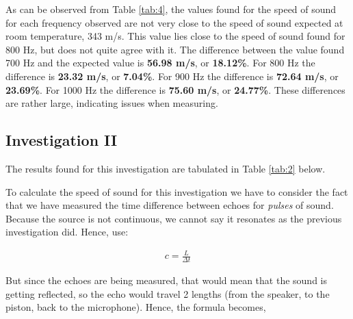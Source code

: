 \documentclass[12pt]{article}
\begin{document}
As can be observed from Table \ref{tab:4}, the values found for the speed of sound for each frequency observed are not very close to the speed of sound expected at room temperature, 343 m/s.
This value lies close to the speed of sound found for 800 Hz, but does not quite agree with it. The difference between the value found 700 Hz and the expected value is \textbf{56.98 m/s}, or \textbf{18.12\%}. For 800 Hz the difference is \textbf{23.32 m/s}, or \textbf{7.04\%}.
For 900 Hz the difference is \textbf{72.64 m/s}, or \textbf{23.69\%}. For 1000 Hz the difference is \textbf{75.60 m/s}, or \textbf{24.77\%}. These differences are rather large, indicating issues when measuring.

\subsection{Investigation II}

The results found for this investigation are tabulated in Table \ref{tab:2} below.

\begin{table}[H]
    \centering
    \caption{Table of the results found for square wave sound pulses.}
    \label{tab:2}
\end{table}

To calculate the speed of sound for this investigation we have to consider the fact that we have measured the time difference between echoes for \textit{pulses} of sound. Because the source is not continuous, we cannot
say it resonates as the previous investigation did. Hence, use:

\vspace{-2ex}
\begin{gather}
    c = \frac{L}{\Delta t}
\end{gather}

But since the echoes are being measured, that would mean that the sound is getting reflected, so the echo would travel 2 lengths (from the speaker, to the piston, back to the microphone). Hence,
the formula becomes,
\end{document}
